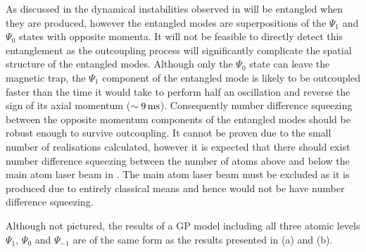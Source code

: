 As discussed in  the dynamical instabilities observed in  will be entangled when they are produced, however the entangled modes are superpositions of the $\Psi_1$ and $\Psi_0$ states with opposite momenta. It will not be feasible to directly detect this entanglement as the outcoupling process will significantly complicate the spatial structure of the entangled modes. Although only the $\Psi_0$ state can leave the magnetic trap, the $\Psi_1$ component of the entangled mode is likely to be outcoupled faster than the time it would take to perform half an oscillation and reverse the sign of its axial momentum ($\sim \unit[9]{ms}$). Consequently number difference squeezing between the opposite momentum components of the entangled modes should be robust enough to survive outcoupling. It cannot be proven due to the small number of realisations calculated, however it is expected that there should exist number difference squeezing between the number of atoms above and below the main atom laser beam in . The main atom laser beam must be excluded as it is produced due to entirely classical means and hence would not be have number difference squeezing.

Although not pictured, the results of a GP model including all three atomic levels $\Psi_1$, $\Psi_0$ and $\Psi_{-1}$ are of the same form as the results presented in (a) and (b).




% 



